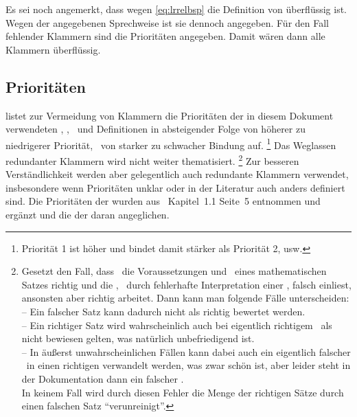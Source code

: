 Es sei noch angemerkt, dass wegen \eqref{eq:lrrelbsp} die Definition von \chrqt{$\metarep$}  überflüssig ist.
Wegen der angegebenen Sprechweise ist sie dennoch angegeben.
Für den Fall fehlender Klammern sind die Prioritäten  angegeben.
Damit wären dann alle Klammern  überflüssig.

\subsection{Prioritäten}%
\label{sub:Prioritäten}

 listet zur Vermeidung von Klammern die Prioritäten der in diesem Dokument verwendeten \Operatoren, \Relationen, \Junktoren\ und Definitionen in absteigender Folge von höherer zu niedrigerer Priorität, \textdh\ von starker zu schwacher Bindung auf.%
\footnote{Priorität 1 ist höher und bindet damit stärker als Priorität 2, usw.}
Das Weglassen redundanter Klammern wird  nicht weiter thematisiert.%
\footnote{%
	Gesetzt den Fall, dass \ASBA\ die Voraussetzungen und \Folgerungen\ eines mathematischen Satzes richtig und die \Beweisschritte, \textzB\ durch fehlerhafte Interpretation einer \Formel, falsch einliest, ansonsten aber richtig arbeitet.
	Dann kann man folgende Fälle unterscheiden:\\
	-- Ein falscher Satz kann dadurch nicht als richtig bewertet werden.\\
	-- Ein richtiger Satz wird wahrscheinlich auch bei eigentlich richtigem \Beweis\ als nicht bewiesen gelten, was natürlich unbefriedigend ist.\\
	-- In äußerst unwahrscheinlichen Fällen kann dabei auch ein eigentlich falscher \Beweis\ in einen richtigen verwandelt werden, was zwar schön ist, aber leider steht in der Dokumentation dann ein falscher \Beweis.\\
	In keinem Fall wird durch diesen Fehler die Menge der richtigen Sätze durch einen falschen Satz \enquote{verunreinigt}.
}
Zur besseren Verständlichkeit werden aber gelegentlich auch redundante Klammern verwendet, insbesondere wenn Prioritäten unklar oder in der Literatur auch anders definiert sind.
Die Prioritäten der \Junktoren wurden aus~\cite{bib:Rautenberg} Kapitel~1.1 Seite~5 entnommen und ergänzt und die der  daran angeglichen.

